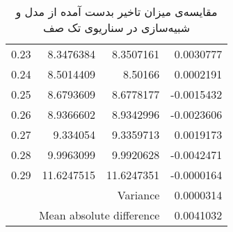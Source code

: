 \begin{table}
\begin{latin}
\begin{tabular}{rrrr}
			0.23                     & 8.3476384                                  & 8.3507161                                     & 0.0030777                 \\
			0.24                     & 8.5014409                                  & 8.50166                                       & 0.0002191                 \\
			0.25                     & 8.6793609                                  & 8.6778177                                     & -0.0015432                \\
			0.26                     & 8.9366602                                  & 8.9342996                                     & -0.0023606                \\
			0.27                     & 9.334054                                   & 9.3359713                                     & 0.0019173                 \\
			0.28                     & 9.9963099                                  & 9.9920628                                     & -0.0042471                \\
			0.29                     & 11.6247515                                 & 11.6247351                                    & -0.0000164                \\ \hline
			\multicolumn{3}{r}{Variance}                                                                                          & 0.0000314                 \\
			\multicolumn{3}{r}{Mean absolute difference}                                                                          & 0.0041032                 \\ \hline
		\end{tabular}
	\end{latin}
	\caption{مقایسه‌ی میزان تاخیر بدست آمده از مدل و شبیه‌سازی در سناریوی تک صف}
	\label{table:scenario1}
\end{table}

